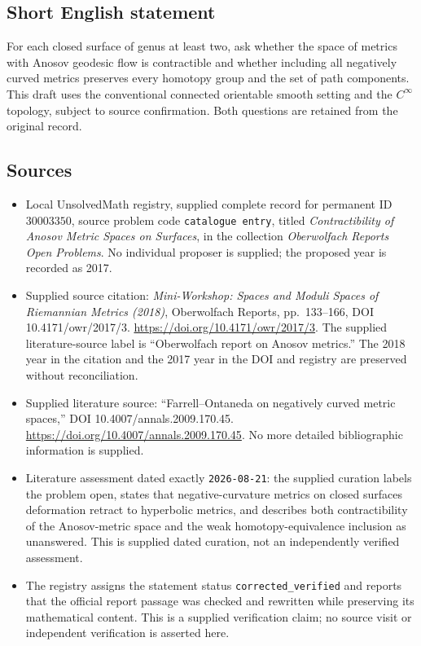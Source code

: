\documentclass[11pt]{article}
\begin{document}
\subsection{Short English statement}
For each closed surface of genus at least two, ask whether the space of metrics with Anosov geodesic flow is contractible and whether including all negatively curved metrics preserves every homotopy group and the set of path components. This draft uses the conventional connected orientable smooth setting and the \(C^\infty\) topology, subject to source confirmation. Both questions are retained from the original record.
\subsection{Sources}
\begin{itemize}
\item Local UnsolvedMath registry, supplied complete record for permanent ID \(30003350\), source problem code \texttt{catalogue entry}, titled \emph{Contractibility of Anosov Metric Spaces on Surfaces}, in the collection \emph{Oberwolfach Reports Open Problems}. No individual proposer is supplied; the proposed year is recorded as 2017.
\item Supplied source citation: \emph{Mini-Workshop: Spaces and Moduli Spaces of Riemannian Metrics (2018)}, Oberwolfach Reports, pp.\ 133--166, DOI 10.4171/owr/2017/3. \url{https://doi.org/10.4171/owr/2017/3}. The supplied literature-source label is ``Oberwolfach report on Anosov metrics.'' The 2018 year in the citation and the 2017 year in the DOI and registry are preserved without reconciliation.
\item Supplied literature source: ``Farrell--Ontaneda on negatively curved metric spaces,'' DOI 10.4007/annals.2009.170.45. \url{https://doi.org/10.4007/annals.2009.170.45}. No more detailed bibliographic information is supplied.
\item Literature assessment dated exactly \texttt{2026-08-21}: the supplied curation labels the problem open, states that negative-curvature metrics on closed surfaces deformation retract to hyperbolic metrics, and describes both contractibility of the Anosov-metric space and the weak homotopy-equivalence inclusion as unanswered. This is supplied dated curation, not an independently verified assessment.
\item The registry assigns the statement status \texttt{corrected\_verified} and reports that the official report passage was checked and rewritten while preserving its mathematical content. This is a supplied verification claim; no source visit or independent verification is asserted here.
\end{itemize}
\end{document}

